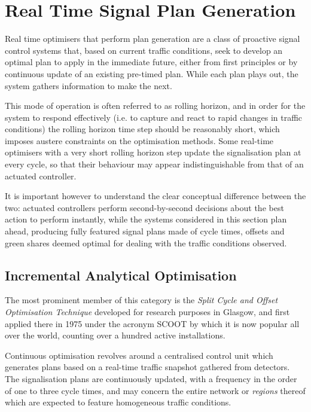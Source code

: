 \section{Real Time Signal Plan Generation}
Real time optimisers that perform plan generation are a class of proactive signal control systems that, based on current traffic conditions, seek to develop an optimal plan to apply in the immediate future, either from first principles or by continuous update of an existing pre-timed plan. While each plan plays out, the system gathers information to make the next.

This mode of operation is often referred to as rolling horizon, and in order for the system to respond effectively (i.e. to capture and react to rapid changes in traffic conditions) the rolling horizon time step should be reasonably short, which imposes austere constraints on the optimisation methods. Some real-time optimisers with a very short rolling horizon step update the signalisation plan at every cycle, so that their behaviour may appear indistinguishable from that of an actuated controller.

It is important however to understand the clear conceptual difference between the two: actuated controllers perform second-by-second decisions about the best action to perform instantly, while the systems considered in this section plan ahead, producing fully featured signal plans made of cycle times, offsets and green shares deemed optimal for dealing with the traffic conditions observed.

\subsection{Incremental Analytical Optimisation}
The most prominent member of this category is the \emph{Split Cycle and Offset Optimisation Technique} developed for research purposes in Glasgow, and first applied there in 1975 under the acronym SCOOT by which it is now popular all over the world, counting over a hundred active installations.

Continuous optimisation revolves around a centralised control unit which generates plans based on a real-time traffic snapshot gathered from detectors. The signalisation plans are continuously updated, with a frequency in the order of one to three cycle times, and may concern the entire network or \emph{regions} thereof which are expected to feature homogeneous traffic conditions.\\

